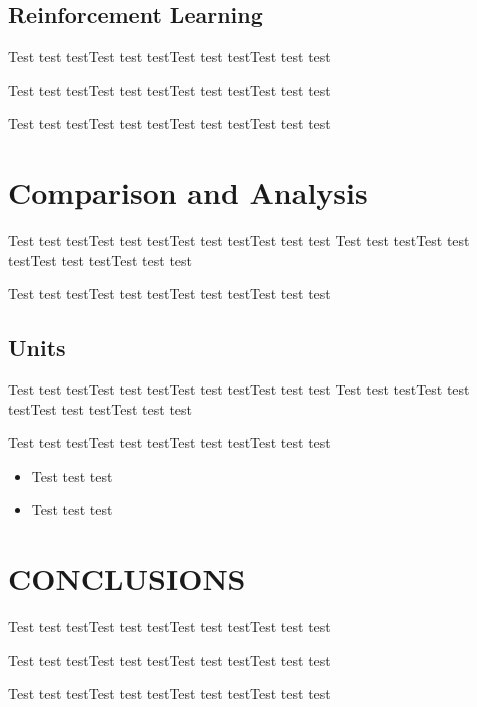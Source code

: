 \documentclass[a4paper, 10pt, conference]{ieeeconf}
\begin{document}
\subsection{Reinforcement Learning}


Test test testTest test testTest test testTest test test

Test test testTest test testTest test testTest test test

Test test testTest test testTest test testTest test test



\section{Comparison and Analysis}

Test test testTest test testTest test testTest test test
Test test testTest test testTest test testTest test test

Test test testTest test testTest test testTest test test

\subsection{Units}


Test test testTest test testTest test testTest test test
Test test testTest test testTest test testTest test test

Test test testTest test testTest test testTest test test


\begin{itemize}

\item Test test test
\item Test test test

\end{itemize}



\section{CONCLUSIONS}


Test test testTest test testTest test testTest test test

Test test testTest test testTest test testTest test test

Test test testTest test testTest test testTest test test

\addtolength{\textheight}{-12cm}   %
\end{document}
